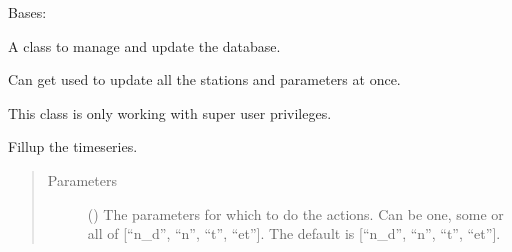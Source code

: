 \documentclass[letterpaper,10pt,english]{sphinxmanual}
\begin{document}
\begin{fulllineitems}
\label{\detokenize{weatherDB:weatherDB.broker.Broker}}
\sphinxAtStartPar
Bases: 

\sphinxAtStartPar
A class to manage and update the database.

\sphinxAtStartPar
Can get used to update all the stations and parameters at once.

\sphinxAtStartPar
This class is only working with super user privileges.

\begin{fulllineitems}
\label{\detokenize{weatherDB:weatherDB.broker.Broker.__init__}}
\end{fulllineitems}


\begin{fulllineitems}
\label{\detokenize{weatherDB:weatherDB.broker.Broker.fillup}}
\sphinxAtStartPar
Fillup the timeseries.
\begin{quote}\begin{description}
\item[{Parameters}] \leavevmode
\sphinxAtStartPar
{} (\sphinxstyleliteralemphasis{\sphinxupquote{, }}) \textendash{} The parameters for which to do the actions.
Can be one, some or all of {[}“n\_d”, “n”, “t”, “et”{]}.
The default is {[}“n\_d”, “n”, “t”, “et”{]}.

\end{description}\end{quote}

\end{fulllineitems}



\end{fulllineitems}
\end{document}
